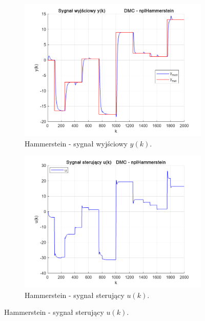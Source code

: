 \begin{figure}[b!]
\centering
\begin{subfigure}[b]{0.49\paperwidth}
\centering
\includegraphics[width=\linewidth]{pictures/y_nplHammerstein}
\caption{Hammerstein - sygnał wyjściowy $y(k)$.}
\end{subfigure}
\hfill
\begin{subfigure}[b]{0.49\paperwidth}
\centering
\includegraphics[width=\linewidth]{pictures/u_nplHammerstein}
\caption{Hammerstein -  sygnał sterujący $u(k)$.}
\end{subfigure}
    
\vspace{0.5cm} %


\end{figure}
